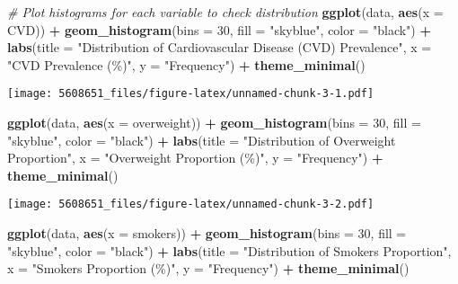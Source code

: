 \documentclass[
]{article}
\newenvironment{Shaded}{\begin{snugshade}}{\end{snugshade}}
\newcommand{\AttributeTok}[1]{\textcolor[rgb]{0.13,0.29,0.53}{#1}}
\newcommand{\CommentTok}[1]{\textcolor[rgb]{0.56,0.35,0.01}{\textit{#1}}}
\newcommand{\DecValTok}[1]{\textcolor[rgb]{0.00,0.00,0.81}{#1}}
\newcommand{\FunctionTok}[1]{\textcolor[rgb]{0.13,0.29,0.53}{\textbf{#1}}}
\newcommand{\NormalTok}[1]{#1}
\newcommand{\SpecialCharTok}[1]{\textcolor[rgb]{0.81,0.36,0.00}{\textbf{#1}}}
\newcommand{\StringTok}[1]{\textcolor[rgb]{0.31,0.60,0.02}{#1}}
\begin{document}
\begin{Shaded}
\begin{Highlighting}[]
\CommentTok{\# Plot histograms for each variable to check distribution}
\FunctionTok{ggplot}\NormalTok{(data, }\FunctionTok{aes}\NormalTok{(}\AttributeTok{x =}\NormalTok{ CVD)) }\SpecialCharTok{+}
  \FunctionTok{geom\_histogram}\NormalTok{(}\AttributeTok{bins =} \DecValTok{30}\NormalTok{, }\AttributeTok{fill =} \StringTok{"skyblue"}\NormalTok{, }\AttributeTok{color =} \StringTok{"black"}\NormalTok{) }\SpecialCharTok{+}
  \FunctionTok{labs}\NormalTok{(}\AttributeTok{title =} \StringTok{"Distribution of Cardiovascular Disease (CVD) Prevalence"}\NormalTok{, }\AttributeTok{x =} \StringTok{"CVD Prevalence (\%)"}\NormalTok{, }\AttributeTok{y =} \StringTok{"Frequency"}\NormalTok{) }\SpecialCharTok{+}
  \FunctionTok{theme\_minimal}\NormalTok{()}
\end{Highlighting}
\end{Shaded}

\texttt{[image: 5608651\_files/figure-latex/unnamed-chunk-3-1.pdf]}

\begin{Shaded}
\begin{Highlighting}[]
\FunctionTok{ggplot}\NormalTok{(data, }\FunctionTok{aes}\NormalTok{(}\AttributeTok{x =}\NormalTok{ overweight)) }\SpecialCharTok{+}
  \FunctionTok{geom\_histogram}\NormalTok{(}\AttributeTok{bins =} \DecValTok{30}\NormalTok{, }\AttributeTok{fill =} \StringTok{"skyblue"}\NormalTok{, }\AttributeTok{color =} \StringTok{"black"}\NormalTok{) }\SpecialCharTok{+}
  \FunctionTok{labs}\NormalTok{(}\AttributeTok{title =} \StringTok{"Distribution of Overweight Proportion"}\NormalTok{, }\AttributeTok{x =} \StringTok{"Overweight Proportion (\%)"}\NormalTok{, }\AttributeTok{y =} \StringTok{"Frequency"}\NormalTok{) }\SpecialCharTok{+}
  \FunctionTok{theme\_minimal}\NormalTok{()}
\end{Highlighting}
\end{Shaded}

\texttt{[image: 5608651\_files/figure-latex/unnamed-chunk-3-2.pdf]}

\begin{Shaded}
\begin{Highlighting}[]
\FunctionTok{ggplot}\NormalTok{(data, }\FunctionTok{aes}\NormalTok{(}\AttributeTok{x =}\NormalTok{ smokers)) }\SpecialCharTok{+}
  \FunctionTok{geom\_histogram}\NormalTok{(}\AttributeTok{bins =} \DecValTok{30}\NormalTok{, }\AttributeTok{fill =} \StringTok{"skyblue"}\NormalTok{, }\AttributeTok{color =} \StringTok{"black"}\NormalTok{) }\SpecialCharTok{+}
  \FunctionTok{labs}\NormalTok{(}\AttributeTok{title =} \StringTok{"Distribution of Smokers Proportion"}\NormalTok{, }\AttributeTok{x =} \StringTok{"Smokers Proportion (\%)"}\NormalTok{, }\AttributeTok{y =} \StringTok{"Frequency"}\NormalTok{) }\SpecialCharTok{+}
  \FunctionTok{theme\_minimal}\NormalTok{()}
\end{Highlighting}
\end{Shaded}
\end{document}
